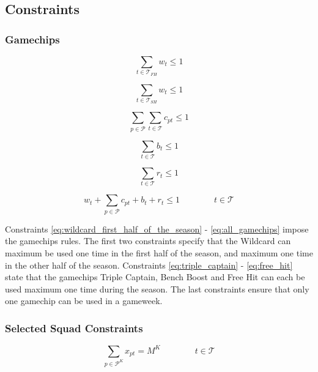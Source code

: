\subsection{Constraints}

\subsubsection{Gamechips} \label{gamechips}


\begin{equation} \label{eq:wildcard_first_half_of_the_season}
    \sum_{t \in \mathcal{T}_{FH}} w_{t} \leq 1
\end{equation}

\begin{equation} \label{eq:wildcard_second_half_of_the_season}
    \sum_{t \in \mathcal{T}_{SH}} w_{t} \leq 1
\end{equation}


\begin{equation} \label{eq:triple_captain} 
    \sum_{p \in \mathcal{P}} \sum_{t \in \mathcal{T}} c_{pt} \leq 1
\end{equation}

\begin{equation} \label{eq:bench_boost}
    \sum_{t \in \mathcal{T}} b_{t} \leq 1
\end{equation}

\begin{equation} \label{eq:free_hit}
    \sum_{t \in \mathcal{T}} r_{t} \leq 1
\end{equation}

\begin{equation} \label{eq:all_gamechips}
   w_{t} + \sum_{p \in \mathcal{P}} c_{pt} + b_{t} + r_{t} \leq 1 \qquad \qquad t \in \mathcal{T}
\end{equation}

Constraints \eqref{eq:wildcard_first_half_of_the_season} - \eqref{eq:all_gamechips} impose the gamechips rules. The first two constraints specify that the Wildcard can maximum be used one time in the first half of the season, and maximum one time in the other half of the season. Constraints \eqref{eq:triple_captain} - \eqref{eq:free_hit} state that the gamechips Triple Captain, Bench Boost and Free Hit can each be used maximum one time during the season. The last constraints ensure that only one gamechip can be used in a gameweek.  

\subsubsection{Selected Squad Constraints} \label{team_sel}
\begin{equation} \label{eq:sel_keeper}
    \sum_{p \in \mathcal{P}^{K}} x_{pt} = M^{K} \qquad\qquad t \in \mathcal{T}
\end{equation}

